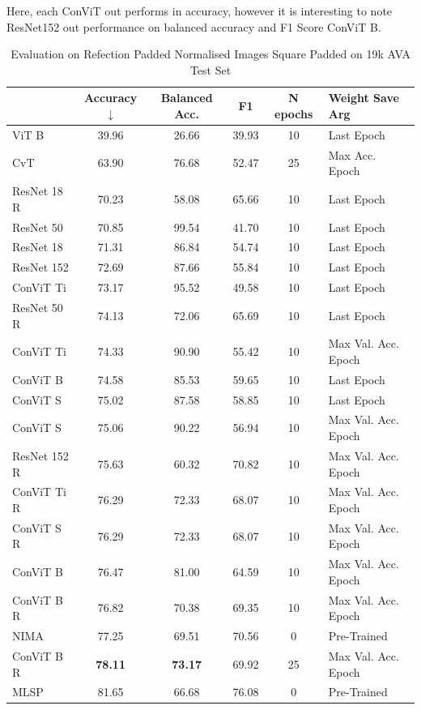 Here, each ConViT out performs in accuracy, however it is interesting to note ResNet152 out performance on balanced accuracy and F1 Score ConViT B. 
\begin{table}[ht!]
\small
    \centering
\begin{tabular}{lccccl}
\toprule
{}             &  Accuracy$\downarrow$ &  Balanced Acc.& F1     & N epochs & Weight Save Arg \\
\midrule
ViT B         &     39.96 &           26.66 &  39.93 & 10       & Last Epoch          \\
CvT           &     63.90 &           76.68 &  52.47 & 25       & Max Acc. Epoch      \\
ResNet 18 R   &     70.23 &           58.08 &  65.66 & 10       & Last Epoch          \\
ResNet 50     &     70.85 &           99.54 &  41.70 & 10       & Last Epoch          \\
ResNet 18     &     71.31 &           86.84 &  54.74 & 10       & Last Epoch          \\
ResNet 152    &     72.69 &           87.66 &  55.84 & 10       & Last Epoch          \\
ConViT Ti     &     73.17 &           95.52 &  49.58 & 10       & Last Epoch          \\
ResNet 50 R   &     74.13 &           72.06 &  65.69 & 10       & Last Epoch          \\
ConViT Ti     &     74.33 &           90.90 &  55.42 & 10       & Max Val. Acc. Epoch \\
ConViT B      &     74.58 &           85.53 &  59.65 & 10       & Last Epoch          \\
ConViT S      &     75.02 &           87.58 &  58.85 & 10       & Last Epoch          \\
ConViT S      &     75.06 &           90.22 &  56.94 & 10       & Max Val. Acc. Epoch \\
ResNet 152 R  &     75.63 &           60.32 &  70.82 & 10       & Max Val. Acc. Epoch \\
ConViT Ti R   &     76.29 &           72.33 &  68.07 & 10       & Max Val. Acc. Epoch \\
ConViT S R    &     76.29 &           72.33 &  68.07 & 10       & Max Val. Acc. Epoch \\
ConViT B      &     76.47       &         81.00 &  64.59 & 10       & Max Val. Acc. Epoch \\
ConViT B R    &     76.82       &         70.38 &  69.35 & 10       & Max Val. Acc. Epoch \\
NIMA          &     77.25       &         69.51 &  70.56 & 0        & Pre-Trained         \\
ConViT B R    & \textbf{78.11}  &\textbf{73.17} &  69.92 & 25       & Max Val. Acc. Epoch \\
MLSP          &     81.65       &         66.68 &  76.08 & 0        & Pre-Trained         \\
\bottomrule
\end{tabular}
\caption{Evaluation on Refection Padded Normalised Images Square Padded on 19k AVA Test Set}
    \label{tab:reflection}
\end{table}

